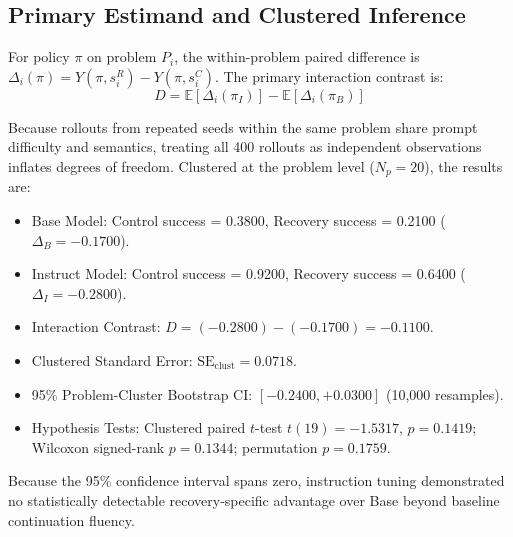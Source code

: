 \documentclass[conference]{IEEEtran}
\begin{document}
\subsection{Primary Estimand and Clustered Inference}
For policy $\pi$ on problem $P_i$, the within-problem paired difference is $\Delta_i(\pi) = Y(\pi, s_i^R) - Y(\pi, s_i^C)$. The primary interaction contrast is:
\begin{equation}
D = \mathbb{E}[\Delta_i(\pi_I)] - \mathbb{E}[\Delta_i(\pi_B)]
\end{equation}

Because rollouts from repeated seeds within the same problem share prompt difficulty and semantics, treating all 400 rollouts as independent observations inflates degrees of freedom. Clustered at the problem level ($N_p = 20$), the results are:
\begin{itemize}
    \item Base Model: Control success = 0.3800, Recovery success = 0.2100 ($\Delta_B = -0.1700$).
    \item Instruct Model: Control success = 0.9200, Recovery success = 0.6400 ($\Delta_I = -0.2800$).
    \item Interaction Contrast: $D = (-0.2800) - (-0.1700) = \mathbf{-0.1100}$.
    \item Clustered Standard Error: $\text{SE}_{\text{clust}} = 0.0718$.
    \item 95\% Problem-Cluster Bootstrap CI: $[-0.2400, +0.0300]$ (10,000 resamples).
    \item Hypothesis Tests: Clustered paired $t$-test $t(19) = -1.5317$, $p = 0.1419$; Wilcoxon signed-rank $p = 0.1344$; permutation $p = 0.1759$.
\end{itemize}

Because the 95\% confidence interval spans zero, instruction tuning demonstrated no statistically detectable recovery-specific advantage over Base beyond baseline continuation fluency.
\end{document}
